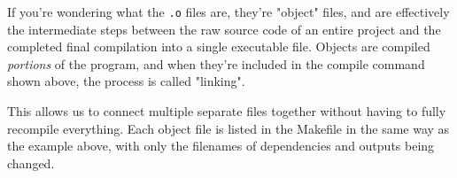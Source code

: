 If you're wondering what the \texttt{.o} files are, they're "object" files, and are effectively the intermediate steps between the raw source code of an entire project and the completed final compilation into a single executable file.  Objects are compiled \textit{portions} of the program, and when they're included in the compile command shown above, the process is called "linking".

This allows us to connect multiple separate files together without having to fully recompile everything.  Each object file is listed in the Makefile in the same way as the example above, with only the filenames of dependencies and outputs being changed.
